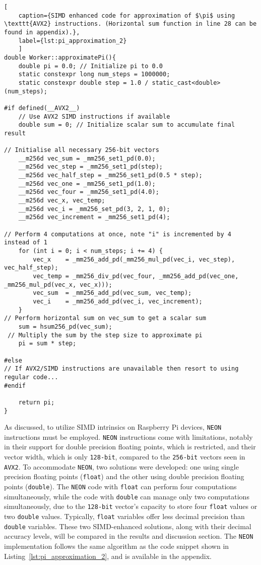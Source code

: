 \begin{lstlisting}[
	caption={SIMD enhanced code for approximation of $\pi$ using \texttt{AVX2} instructions. (Horizontal sum function in line 28 can be found in appendix).},
	label={lst:pi_approximation_2}
	]
double Worker::approximatePi(){
	double pi = 0.0; // Initialize pi to 0.0
	static constexpr long num_steps = 1000000; 
	static constexpr double step = 1.0 / static_cast<double>(num_steps); 
	
#if defined(__AVX2__)
	// Use AVX2 SIMD instructions if available
	double sum = 0; // Initialize scalar sum to accumulate final result
	
// Initialise all necessary 256-bit vectors
	__m256d vec_sum = _mm256_set1_pd(0.0);
	__m256d vec_step = _mm256_set1_pd(step);
	__m256d vec_half_step = _mm256_set1_pd(0.5 * step); 
	__m256d vec_one = _mm256_set1_pd(1.0); 
	__m256d vec_four = _mm256_set1_pd(4.0); 
	__m256d vec_x, vec_temp; 
	__m256d vec_i = _mm256_set_pd(3, 2, 1, 0); 
	__m256d vec_increment = _mm256_set1_pd(4); 

// Perform 4 computations at once, note "i" is incremented by 4 instead of 1
	for (int i = 0; i < num_steps; i += 4) {
		vec_x    = _mm256_add_pd(_mm256_mul_pd(vec_i, vec_step), vec_half_step); 
		vec_temp = _mm256_div_pd(vec_four, _mm256_add_pd(vec_one, _mm256_mul_pd(vec_x, vec_x))); 
		vec_sum  = _mm256_add_pd(vec_sum, vec_temp); 
		vec_i    = _mm256_add_pd(vec_i, vec_increment); 
	}
// Perform horizontal sum on vec_sum to get a scalar sum
	sum = hsum256_pd(vec_sum);
 // Multiply the sum by the step size to approximate pi
	pi = sum * step; 

#else
// If AVX2/SIMD instructions are unavailable then resort to using regular code... 
#endif

	return pi; 
}
\end{lstlisting}

As discussed, to utilize SIMD intrinsics on Raspberry Pi devices, \texttt{NEON} instructions must be employed. \texttt{NEON} instructions come with limitations, notably in their support for double precision floating points, which is restricted, and their vector width, which is only \texttt{128-bit}, compared to the \texttt{256-bit} vectors seen in \texttt{AVX2}\cite{neon_reference}. To accommodate \texttt{NEON}, two solutions were developed: one using single precision floating points (\texttt{float}) and the other using double precision floating points (\texttt{double}). The \texttt{NEON} code with \texttt{float} can perform four computations simultaneously, while the code with \texttt{double} can manage only two computations simultaneously, due to the \texttt{128-bit} vector's capacity to store four \texttt{float} values or two \texttt{double} values. Typically, \texttt{float} variables offer less decimal precision than \texttt{double} variables. These two SIMD-enhanced solutions, along with their decimal accuracy levels, will be compared in the results and discussion section. The \texttt{NEON} implementation follows the same algorithm as the code snippet shown in Listing~\ref{lst:pi_approximation_2}, and is available in the appendix.

